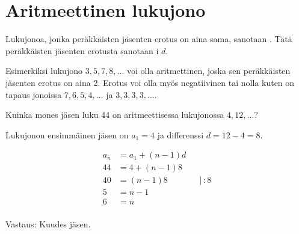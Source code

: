 \section{Aritmeettinen lukujono}

Lukujonoa, jonka peräkkäisten jäsenten erotus on aina sama, sanotaan . Tätä peräkkäisten jäsenten erotusta sanotaan i $d$.



Esimerkiksi lukujono $3, 5, 7, 8, \ldots$ voi olla aritmettinen, joska sen peräkkäisten jäsenten erotus on aina 2. Erotus voi olla myös negatiivinen tai nolla kuten on tapaus jonoissa  $7, 6, 5, 4, \ldots$ ja  $3, 3, 3, 3, \ldots$.

\begin{esimerkki}

Kuinka mones jäsen luku 44 on aritmeettisessa lukujonossa $4, 12,  \ldots$?

Lukujonon ensimmäinen jäsen on $a_1=4$ ja differenssi $d=12-4=8$.

\begin{align*}
	a_n &= a_1+(n-1)d  \\
	44 &= 4 +(n-1)8  \\
	40 &= (n-1)8 & & | \, :8 \\
	5 &= n-1 \\
	6 &= n\\
\end{align*}

Vastaus: Kuudes jäsen.

\end{esimerkki}


